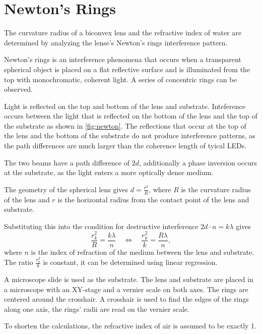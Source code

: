\chapter{Newton's Rings}

The curvature radius of a biconvex lens and the refractive index of water are determined by analyzing the lense's Newton's rings interference pattern.


Newton's rings is an interference phenomena that occurs when a transparent spherical object is placed on a flat reflective surface and is illuminated from the top with monochromatic, coherent light.
A series of concentric rings can be observed.

Light is reflected on the top and bottom of the lens and substrate.
Inteference occurs between the light that is reflected on the bottom of the lens and the top of the substrate as shown in \autoref{fig:newton}.
The reflections that occur at the top of the lens and the bottom of the substrate do not produce interference patterns, as the path differences are much larger than the coherence length of tyical LEDs.

The two beams have a path difference of $2 d$, additionally a phase inversion occurs at the substrate, as the light enters a more optically dense medium.

The geometry of the spherical lens gives $d = \frac{r^2}{R}$, where $R$ is the curvature radius of the lens and $r$ is the horizontal radius from the contact point of the lens and substrate.

Substituting this into the condition for destructive interference $2 d \cdot n = k \lambda$ gives
\begin{equation}\label{eq:newton}
	\frac{r_k^2}{R} = \frac{k \lambda}{n} \quad \Leftrightarrow \quad \frac{r_k^2}{k} = \frac{R \lambda}{n},
\end{equation}
where $n$ is the index of refraction of the medium between the lens and substrate.
The ratio $\frac{r_k^2}{k}$ is constant, it can be determined using linear regression.

A microscope slide is used as the substrate.
The lens and substrate are placed in a microscope with an XY-stage and a vernier scale on both axes.
The rings are centered around the crosshair.
A crosshair is used to find the edges of the rings along one axis, the rings' radii are read on the vernier scale.

To shorten the calculations, the refractive index of air is assumed to be exactly \num{1}.

